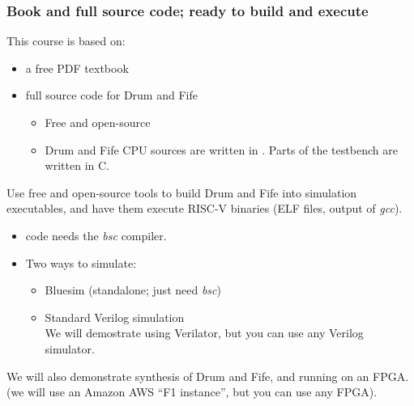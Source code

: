 \begin{frame}
\frametitle{Book and full source code; ready to build and execute}

\footnotesize

This course is based on:

\begin{itemize}
\item a free PDF textbook
\item full source code for Drum and Fife
  \begin{itemize}\footnotesize
  \item Free and open-source

  \item Drum and Fife CPU sources are written in {\BSV}.  Parts of the
        testbench are written in C.
  \end{itemize}
\end{itemize}

\PAUSE{\vspace{1ex}}

Use free and open-source tools to build Drum and Fife into
simulation executables, and have them execute RISC-V binaries
(ELF files, output of \emph{gcc}).

\begin{itemize}
\item {\BSV} code needs the \emph{bsc} compiler.

\item Two ways to simulate:
  \begin{itemize}\footnotesize
    \item Bluesim (standalone; just need \emph{bsc})
    \item Standard Verilog simulation \\
      We will demostrate using Verilator, but you can use any Verilog simulator.
  \end{itemize}
\end{itemize}

\PAUSE{\vspace{1ex}}

We will also demonstrate synthesis of Drum and Fife, and running on an FPGA. \\
(we will use an Amazon AWS ``F1 instance'', but you can use any FPGA).

\end{frame}


